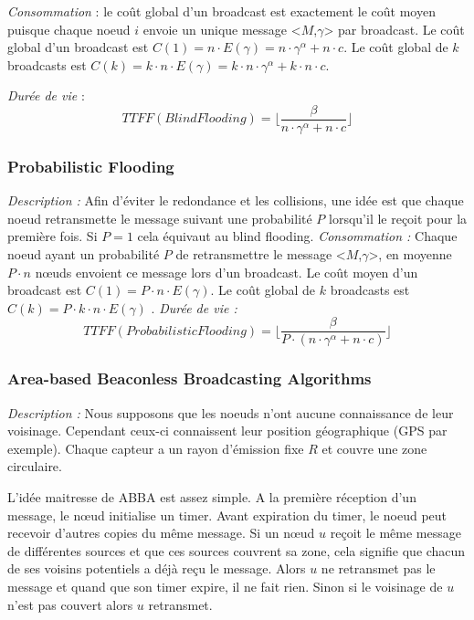\emph{Consommation} :  le coût global d'un broadcast est exactement le coût moyen puisque chaque noeud $i$ envoie un unique message <$M$,$\gamma$> par broadcast.
Le coût global d'un broadcast est $C(1) = n \cdot E( \gamma )= n\cdot \gamma^\alpha +  n\cdot c $.
Le coût global de $k$ broadcasts est $C(k) = k\cdot n \cdot E( \gamma )= k\cdot n \cdot \gamma^\alpha +  k \cdot n\cdot c $.

\emph{Durée de vie} :   $$TTFF(Blind Flooding)=\lfloor \frac{\beta}{n\cdot \gamma^\alpha +  n\cdot c} \rfloor$$



\subsubsection{Probabilistic Flooding\label{proba_flooding}}

\emph{Description :} Afin d'éviter le redondance et les collisions, une idée est que chaque noeud retransmette le message suivant une probabilité $P$ lorsqu'il le reçoit pour la première fois. Si $P=1$ cela équivaut au blind flooding.
\emph{Consommation :} Chaque noeud ayant un probabilité $P$ de retransmettre le message <$M$,$\gamma$>, en moyenne $P\cdot n$ nœuds envoient ce message lors d'un broadcast.
Le coût moyen d'un broadcast est $C(1) = P\cdot n \cdot E( \gamma ) $. Le coût global de $k$ broadcasts est $C(k) = P\cdot k\cdot n \cdot E( \gamma ) $ .
\emph{Durée de vie :} $$TTFF(Probabilistic Flooding)=\lfloor \frac{\beta}{P \cdot (n\cdot \gamma^\alpha +  n\cdot c)} \rfloor$$


\subsubsection{Area-based Beaconless Broadcasting Algorithms \cite{Ovalle2006}}


\emph{Description :} Nous supposons que les noeuds n'ont aucune connaissance de leur voisinage. Cependant ceux-ci connaissent leur position géographique (GPS par exemple). Chaque capteur a un rayon d'émission fixe $R$ et couvre une zone circulaire.


L'idée maitresse de ABBA est assez simple. A la première réception d'un message, le nœud initialise un timer. Avant expiration du timer, le noeud peut recevoir d'autres copies du même message. Si un nœud $u$ reçoit le même message de différentes sources et que ces sources couvrent sa zone, cela signifie que chacun de ses voisins potentiels a déjà reçu le message. Alors $u$ ne retransmet pas le message et quand que son timer expire, il ne fait rien. Sinon si le voisinage de $u$ n'est pas couvert alors $u$ retransmet.

